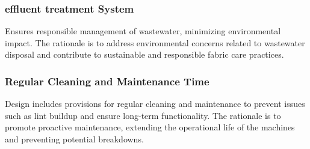 \documentclass[12pt]{article} %
\begin{document}
 \subsubsection{\Gls{effluent treatment} System} Ensures responsible management of wastewater, minimizing environmental impact. The rationale is to address environmental concerns related to wastewater disposal and contribute to sustainable and responsible fabric care practices.
 
 \subsubsection{Regular Cleaning and Maintenance Time} Design includes provisions for regular cleaning and maintenance to prevent issues such as lint buildup and ensure long-term functionality. The rationale is to promote proactive maintenance, extending the operational life of the machines and preventing potential breakdowns.


\clearpage
\end{document}
